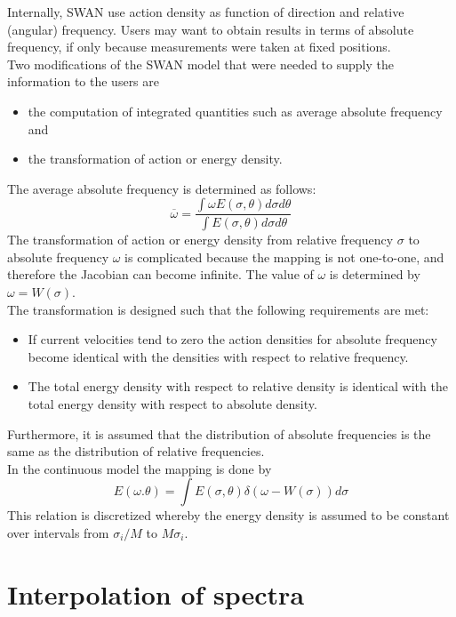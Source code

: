 \documentclass[12pt]{book}
\begin{document}
Internally, SWAN use action density as function of direction and relative (angular) frequency. Users may want
to obtain results in terms of absolute frequency, if only because measurements were taken at fixed positions.
\\[2ex]
Two modifications of the SWAN model that were needed to supply the information to the users are
\begin{itemize}
  \item the computation of integrated quantities such as average absolute frequency and
  \item the transformation of action or energy density.
\end{itemize}
The average absolute frequency is determined as follows:
\begin{equation}
  \overline{\omega} = \frac{\int \omega E(\sigma,\theta)d\sigma d\theta}{\int E(\sigma,\theta)d\sigma d\theta}
\end{equation}
The transformation of action or energy density from relative frequency $\sigma$ to absolute frequency $\omega$
is complicated because the mapping is not one-to-one, and therefore the Jacobian can become infinite. The
value of $\omega$ is determined by $\omega = W(\sigma)$.
\\[2ex]
The transformation is designed such that the following requirements are met:
\begin{itemize}
  \item If current velocities tend to zero the action densities for absolute frequency become identical
        with the densities with respect to relative frequency.
  \item The total energy density with respect to relative density is identical with the total energy density
        with respect to absolute density.
\end{itemize}
Furthermore, it is assumed that the distribution of absolute frequencies is the same as the distribution of
relative frequencies.
\\[2ex]
In the continuous model the mapping is done by
\begin{equation}
  E(\omega.\theta) = \int E(\sigma,\theta)\delta (\omega-W(\sigma)) d\sigma
\end{equation}
This relation is discretized whereby the energy density is assumed to be constant over intervals from
$\sigma_i/M$ to $M\sigma_i$.

\section{Interpolation of spectra}
\end{document}
